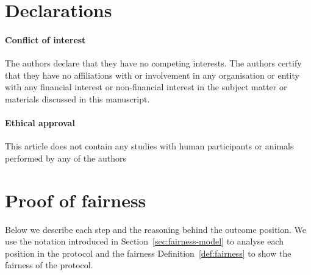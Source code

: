 \documentclass[pdftex,twocolumn,epjc3]{svjour3}
\newcommand{\customer}{customer}
\renewcommand{\sp}{SP}
\begin{document}
{\section*{Declarations}

\paragraph{Conflict of interest} The authors declare that they have no competing interests. The authors certify that they have no affiliations with or involvement in any organisation or entity with any financial interest or non-financial interest in the subject matter or materials discussed in this manuscript.

\paragraph{Ethical approval} This article does not contain any studies with human participants or animals performed by any of the authors


\appendix

\section{Proof of fairness}\label{app:proof-of-fairness}
Below we describe each step and the reasoning behind the outcome position.
We use the notation introduced in Section~\ref{sec:fairness-model} to analyse each position in the protocol and the fairness Definition~\ref{def:fairness} to show the fairness of the protocol.

\newcommand{\AgreeablePath}{Agreeable path:}
\newcommand{\DisputePath}{The \customer{} starts a dispute:}
\newcommand{\Fairness}{Fairness:}
\newcommand{\CustomerTurn}[0]{\expandafter\MakeUppercase \customer{} turn:}
\newcommand{\SPTurn}[0]{\sp{} turn:}

\newcommand{\CanFollowToOne}[2]{The #1 can follow the protocol to the non-disadvantaged position #2}
\newcommand{\CanDoNothing}[1]{The #1 can do nothing and always ends up in the non-disadvantaged position}
\newcommand{\CanDoAnything}[1]{The #1 can do anything and always ends up in the non-disadvantaged position}
\newcommand{\Pos}[4]{$\operatorname{\sigma_{#1, #2, #3} = #4}$}
\newcommand{\WinForTheSameReason}[1]{The #1 wins the dispute for the same reason}
\newcommand{\LoseForTheSameReason}[1]{The #1 loses the dispute for the same reason}
\newcommand{\ActedAbnormallyThen}[1]{The #1 acted abnormally, then:}
\newcommand{\CustomerPaidButDidntGetResult}{The customer ends up in a disadvantageous position, because he has paid in advance, but hasn't received the result}
\newcommand{\SpReceivedThePayment}{The SP ends up in the advantageous position, having received the payment}

}
\end{document}
